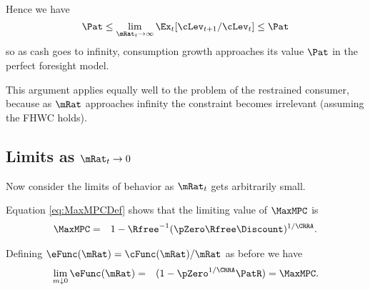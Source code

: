 \documentclass[titlepage]{\econtex}\providecommand{\texname}{BufferStockTheory}%
\begin{document}
{Hence we have
\begin{equation}
  {\Pat}  \leq \lim_{\mRat_{t} \rightarrow \infty} \Ex_{t}[\cLev_{t+1}/\cLev_{t}] \leq {\Pat} \nonumber
\end{equation}
so as cash goes to infinity, consumption growth approaches its
value $\Pat$ in the perfect foresight model.

This argument applies equally well to the problem of the restrained
consumer, because as $\mRat$ approaches infinity the constraint becomes
irrelevant (assuming the FHWC holds).

\begin{comment}
Of course, the constraint never becomes irrelevant if human wealth is
infinite.  We ruled out infinite human wealth at the beginning of this
section by assuming $\Rfree> \PGro$.  If this finite human wealth
condition does not hold, it is possible to show that for any finite
horizon consumer the marginal propensity to consume approaches the
finite-horizon perfect foresight MPC as wealth approaches infinity.
However, as the horizon gets longer, the perfect foresight MPC
approaches zero.  It can be shown therefore that the limiting MPC for
the converged consumption function approaches (but never reaches)
zero.  (This is why we chose $\MinMinMPC=0$ if the FHWC fails
in the proofs above.)
\end{comment}

\subsection{Limits as $\mRat_t \rightarrow 0$}

\label{subsec:xtto0} Now consider the limits of behavior as $\mRat_{t}$ gets
arbitrarily small.

Equation \eqref{eq:MaxMPCDef} shows that the limiting value of
$\MaxMPC$ is
\begin{eqnarray}
 \MaxMPC & = & 1-{\Rfree}^{-1}(\pZero  \Rfree\Discount)^{1/\CRRA}. \nonumber
\end{eqnarray}

Defining $\eFunc(\mRat)=\cFunc(\mRat)/\mRat$ as before we have
\begin{eqnarray}
  \lim_{m \downarrow 0} \eFunc(\mRat) & = & (1-\pZero^{1/\CRRA}\PatR) = \MaxMPC \nonumber.
\end{eqnarray}

}
\end{document}
